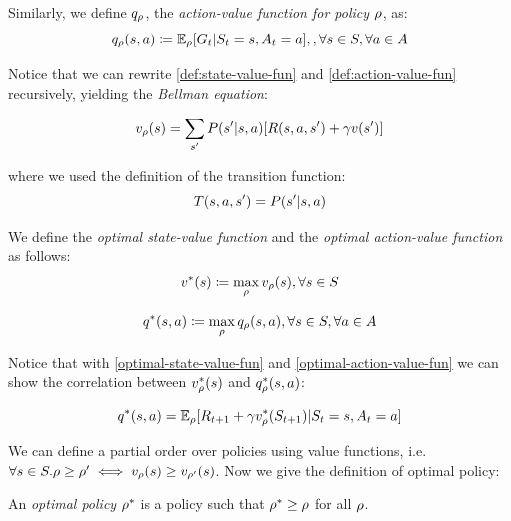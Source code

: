 Similarly, we define $q_\rho$, the \emph{action-value function for policy $\rho$}, as:
\begin{equation}
\label{def:action-value-fun}
q_\rho(s, a) \coloneqq \mathbb{E}_{\rho}[G_t | S_t = s, A_t = a], , \forall s \in S, \forall a \in A
\end{equation}

Notice that we can rewrite \ref{def:state-value-fun} and \ref{def:action-value-fun} recursively, yielding the \emph{Bellman equation}:

\begin{equation}
\label{def:bellman-state-value-fun}
v_\rho(s) =  \sum_{s'} P(s' | s,a)[R(s,a,s') + \gamma v(s')] 
\end{equation}

where we used the definition of the transition function:
\begin{equation}
T(s,a,s') = P(s' | s,a)
\end{equation}

We define the \emph{optimal state-value function} and the \emph{optimal action-value function} as follows:
\begin{equation}
\label{optimal-state-value-fun}
v^*(s)  \coloneqq \max_\rho  v_\rho(s), \forall s\in S		
\end{equation}

\begin{equation}
\label{optimal-action-value-fun}
q^*(s, a) \coloneqq \max_\rho  q_\rho(s, a), \forall s\in S, \forall a\in A
\end{equation}

Notice that with \ref{optimal-state-value-fun} and \ref{optimal-action-value-fun} we can show the correlation between $v^*_\rho(s)$ and $q^*_\rho(s, a)$:

\begin{equation}
q^*(s, a) = \mathbb{E}_\rho[R_{t+1} + \gamma v^*_\rho(S_{t+1})| S_t = s, A_t = a]
\end{equation}


We can define a partial order over policies using value functions, i.e. $\forall s\in S. \rho \ge \rho' \iff v_\rho(s) \ge v_{\rho'}(s)$. 
Now we give the definition of optimal policy:
\begin{definition}\label{def:optimal-policy}
	An \emph{optimal policy} $\rho^*$ is a policy such that $\rho^* \ge \rho$ for all $\rho$. 
\end{definition}


